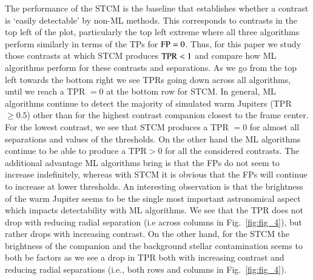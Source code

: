 \documentclass{aa}
\begin{document}
The performance of the STCM is the baseline that establishes whether a contrast is `easily detectable' by non-ML methods. 
This corresponds to contrasts in the top left of the plot, particularly the top left extreme where all three algorithms perform similarly in terms of the TPs for ${\rm FP}=0$.
Thus, for this paper we study those contrasts at which STCM produces ${\rm TPR}<1$ and compare how ML algorithms perform for these contrasts and separations.
As we go from the top left towards the bottom right we see TPRs going down across all algorithms, until we reach a TPR $=0$ at the bottom row for STCM. 
In general, ML algorithms continue to detect the majority of simulated warm Jupiters (TPR $\ge 0.5$) other than for the highest contrast companion closest to the frame center.
For the lowest contrast, we see that STCM produces a TPR $=0$ for almost all separations and values of the thresholds.
On the other hand the ML algorithms continue to be able to produce a TPR$>0$ for all the considered contrasts.
The additional advantage ML algorithms bring is that the FPs do not seem to increase indefinitely, whereas with STCM it is obvious that the FPs will continue to increase at lower thresholds.
An interesting observation is that the brightness of the warm Jupiter seems to be the single most important astronomical aspect which impacts detectability with ML algorithms.
We see that the TPR does not drop with reducing radial separation (i.e across columns in Fig.~\ref{fig:fig_4}), but rather drops with increasing contrast. 
On the other hand, for the STCM the brightness of the companion and the background stellar contamination seems to both be factors as we see a drop in TPR both with increasing contrast and reducing radial separations (i.e., both rows and columns in Fig.~\ref{fig:fig_4}).

\end{document}
